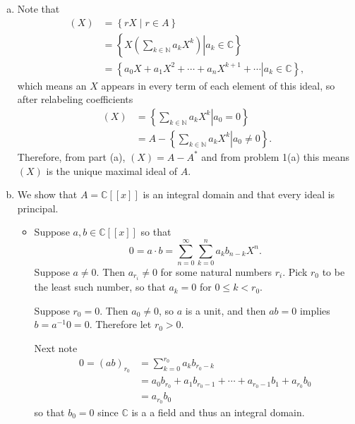 \documentclass{article}
\begin{document}
\begin{Answer}
\begin{enumerate}[(a)]
{    }
    \item{
      Note that
      \begin{align*}
         (X)
      &= \left\{ r X \mid r \in A \right\} \\
      &= \left\{
           \left.
             X
             \left(
               \sum_{k \in \mathbb{N}} a_k X^k
             \right)
           \right|
             a_k \in \mathbb{C}
         \right\} \\
      &= \left\{
           \left.
             a_0 X + a_1 X^2 + \cdots + a_n X^{k+1} + \cdots
           \right|
             a_{k} \in \mathbb{C}
         \right\},
      \end{align*}
      which means an $X$ appears in every term of each element of this
      ideal, so after relabeling coefficients
      \begin{align*}
         (X)
      &= \left\{
           \left.
             \sum_{k \in \mathbb{N}} a_k X^k
           \right|
             a_0 = 0
         \right\} \\
      &= A -
         \left\{
           \left.
             \sum_{k \in \mathbb{N}} a_k X^k
           \right|
             a_0 \neq 0
         \right\}.
      \end{align*}
      Therefore, from part (a), $(X) = A - A^\ast$
      and from problem 1(a) this means $(X)$ is the unique maximal
      ideal of $A$.
    }
    \item{
      We show that $A = \mathbb{C}[[x]]$ is an integral domain and that every ideal
      is principal.
      \begin{itemize}
        \item{
          Suppose $a, b \in \mathbb{C}[[x]]$ so that
          $$
          0 = a \cdot b = \sum_{n=0}^\infty \sum_{k=0}^n a_k b_{n-k} X^n.
          $$
          Suppose $a \neq 0$. Then $a_{r_i} \neq 0$ for some
          natural numbers $r_i$. Pick $r_0$ to be the least such number,
          so that $a_{k} = 0$ for $0 \leq k < r_0$.

          Suppose $r_0 = 0$. Then $a_0 \neq 0$, so $a$ is a unit, and
          then $ab = 0$ implies $b = a^{-1} 0 = 0$. Therefore let $r_0
          > 0$.

          Next note
          \begin{align*}
           0 = (ab)_{r_0}
            &= \sum_{k=0}^{r_0} a_k b_{r_0 - k} \\
            &= a_0 b_{r_0}
             + a_1 b_{r_0 - 1}
             + \cdots
             + a_{r_0 - 1} b_1
             + a_{r_0} b_0 \\
            &= a_{r_0} b_0
          \end{align*}
          so that $b_0 = 0$ since $\mathbb{C}$ is a a field and thus
          an integral domain.

}
\end{itemize}}
\end{enumerate}
\end{Answer}
\end{document}
